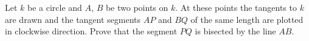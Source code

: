 Let $k$ be a circle and $A$, $B$ be two points on $k$. At these points the
tangents to $k$ are drawn and the tangent segments $AP$ and $BQ$ of the same length
are plotted in clockwise direction. 
Prove that the segment $PQ$ is bisected by the line $AB$.